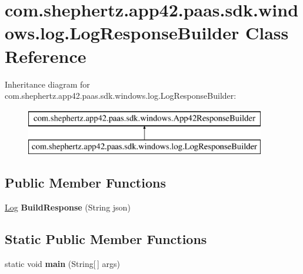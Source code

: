 \hypertarget{classcom_1_1shephertz_1_1app42_1_1paas_1_1sdk_1_1windows_1_1log_1_1_log_response_builder}{\section{com.\+shephertz.\+app42.\+paas.\+sdk.\+windows.\+log.\+Log\+Response\+Builder Class Reference}
\label{classcom_1_1shephertz_1_1app42_1_1paas_1_1sdk_1_1windows_1_1log_1_1_log_response_builder}
}
Inheritance diagram for com.\+shephertz.\+app42.\+paas.\+sdk.\+windows.\+log.\+Log\+Response\+Builder\+:\begin{figure}[H]
\begin{center}
\leavevmode
\includegraphics[height=2.000000cm]{classcom_1_1shephertz_1_1app42_1_1paas_1_1sdk_1_1windows_1_1log_1_1_log_response_builder}
\end{center}
\end{figure}
\subsection*{Public Member Functions}
\begin{DoxyCompactItemize}
\item 
\hypertarget{classcom_1_1shephertz_1_1app42_1_1paas_1_1sdk_1_1windows_1_1log_1_1_log_response_builder_a8b481dc58be3b27ebd72ced6f5fbc9ea}{\hyperlink{classcom_1_1shephertz_1_1app42_1_1paas_1_1sdk_1_1windows_1_1log_1_1_log}{Log} {\bfseries Build\+Response} (String json)}\label{classcom_1_1shephertz_1_1app42_1_1paas_1_1sdk_1_1windows_1_1log_1_1_log_response_builder_a8b481dc58be3b27ebd72ced6f5fbc9ea}

\end{DoxyCompactItemize}
\subsection*{Static Public Member Functions}
\begin{DoxyCompactItemize}
\item 
\hypertarget{classcom_1_1shephertz_1_1app42_1_1paas_1_1sdk_1_1windows_1_1log_1_1_log_response_builder_ac3a73155c1d06df8f0f03d8b9d3084c4}{static void {\bfseries main} (String\mbox{[}$\,$\mbox{]} args)}\label{classcom_1_1shephertz_1_1app42_1_1paas_1_1sdk_1_1windows_1_1log_1_1_log_response_builder_ac3a73155c1d06df8f0f03d8b9d3084c4}

\end{DoxyCompactItemize}
